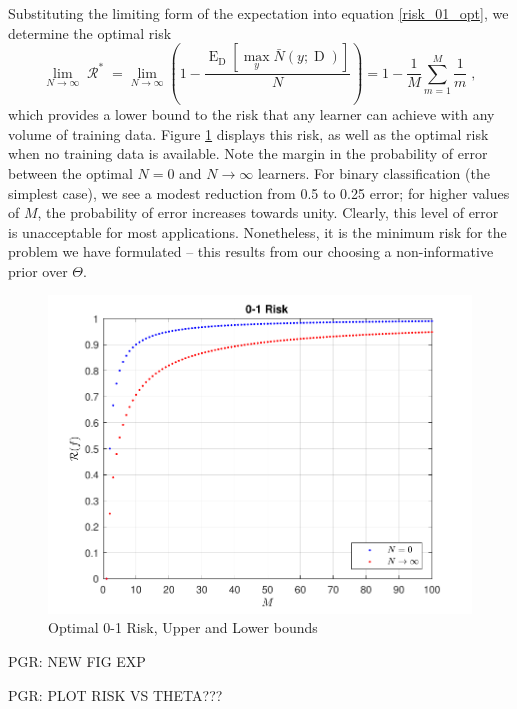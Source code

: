 \documentclass[12pt]{report}
\DeclareMathOperator{\Drm}{\mathrm{D}}
\DeclareMathOperator{\Erm}{\mathrm{E}}
\DeclareMathOperator{\Rcal}{\mathcal{R}}
\begin{document}
Substituting the limiting form of the expectation into equation \eqref{risk_01_opt}, we determine the optimal risk
\begin{equation}
\lim_{N \to \infty} \Rcal^*  = \lim_{N \to \infty} \left( 1 - \frac{\Erm_{\Drm} \left[ \max_y \bar{N}(y;\Drm) \right]}{N} \right) = 1 - \frac{1}{M} \sum_{m=1}^M \frac{1}{m} \;,
\end{equation}
which provides a lower bound to the risk that any learner can achieve with any volume of training data. Figure \ref{fig:Risk_01_LB} displays this risk, as well as the optimal risk when no training data is available. Note the margin in the probability of error between the optimal $N=0$ and $N \to \infty$ learners. For binary classification (the simplest case), we see a modest reduction from 0.5 to 0.25 error; for higher values of $M$, the probability of error increases towards unity. Clearly, this level of error is unacceptable for most applications. Nonetheless, it is the minimum risk for the problem we have formulated -- this results from our choosing a non-informative prior over $\Theta$.

\begin{figure}
\centering
\includegraphics[width=0.8\linewidth]{Risk_01_LB.pdf}
\caption{Optimal 0-1 Risk, Upper and Lower bounds}
\label{fig:Risk_01_LB}
\end{figure}

PGR: NEW FIG EXP

PGR: PLOT RISK VS THETA???
\end{document}
